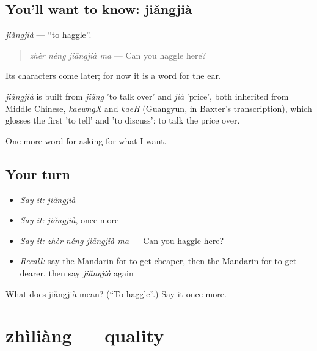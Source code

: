 \subsection*{You'll want to know: jiǎngjià}
\emph{jiǎngjià} — \textquotedblleft{}to haggle\textquotedblright{}.

\begin{quote}
\emph{zhèr néng jiǎngjià ma} — Can you haggle here?
\end{quote}

Its characters come later; for now it is a word for the ear.

\begin{cousinweb}
\emph{jiǎngjià} is built from \emph{jiǎng} 'to talk over' and \emph{jià} 'price', both inherited from Middle Chinese, \emph{kaewngX} and \emph{kaeH} (Guangyun, in Baxter's transcription), which glosses the first 'to tell' and 'to discuss': to talk the price over.
\end{cousinweb}

\begin{grammarlens}[title={What you've built}]
One more word for asking for what I want.
\end{grammarlens}

\subsection*{Your turn}
\begin{itemize}
\raggedright
  \item \emph{Say it:} \emph{jiǎngjià}
  \item \emph{Say it:} \emph{jiǎngjià}, once more
  \item \emph{Say it:} \emph{zhèr néng jiǎngjià ma} — Can you haggle here?
  \item \emph{Recall:} say the Mandarin for to get cheaper, then the Mandarin for to get dearer, then say \emph{jiǎngjià} again
\end{itemize}

\begin{tcolorbox}[breakable,colback=teal!4,colframe=teal!35!black,title={Before you move on}]
What does jiǎngjià mean? (\textquotedblleft{}To haggle\textquotedblright{}.) Say it once more.
\end{tcolorbox}
\section[zhìliàng]{zhìliàng — quality}

\label{lesson:ZH-C193-zhiliang}



